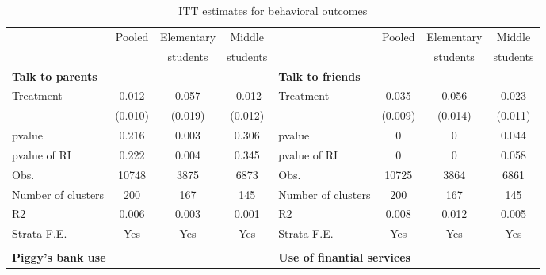 \begin{table}[h!]
\begin{threeparttable}
\centering
\fontsize{9}{10} \selectfont
\caption{ITT estimates for behavioral outcomes}
\begin{tabular}{lccclccc}
\hline
\hline
           &     Pooled &    Elementary &     Middle &            &     Pooled &    Elementary &     Middle \\

           &            &   students &   students &            &            &   students &   students \\

       \multicolumn{ 4}{l}{{\bf Talk to parents}} &        \multicolumn{ 4}{l}{{\bf Talk to friends}} \\

 Treatment &      0.012 &   0.057 &     -0.012 &  Treatment &   0.035 &   0.056 &    0.023 \\

           &    (0.010) &    (0.019) &    (0.012) &            &    (0.009) &    (0.014) &    (0.011) \\

    pvalue &      0.216 &      0.003 &      0.306 &     pvalue &          0 &          0 &      0.044 \\

pvalue of RI &      0.222 &      0.004 &      0.345 & pvalue of RI &          0 &          0 &      0.058 \\

      Obs. &      10748 &       3875 &       6873 &       Obs. &      10725 &       3864 &       6861 \\

Number of clusters &        200 &        167 &        145 & Number of clusters &        200 &        167 &        145 \\

        R2 &      0.006 &      0.003 &      0.001 &         R2 &      0.008 &      0.012 &      0.005 \\

Strata F.E. &        Yes &        Yes &        Yes & Strata F.E. &        Yes &        Yes &        Yes \\

           &            &            &            &            &            &            &            \\
\hline
      \multicolumn{ 4}{l}{{\bf Piggy's bank use}} & \multicolumn{ 4}{l}{{\bf Use of finantial services}} \\


\end{tabular}
\end{threeparttable}
\end{table}
